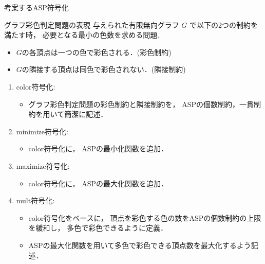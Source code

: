 \documentclass[dvipdfmx,11pt]{beamer}
\begin{document}

\begin{frame}{ 考案するASP符号化}
 \begin{block}{グラフ彩色判定問題の表現}
  与えられた有限無向グラフ $G$ で以下の2つの制約を満たす時，
  必要となる最小の色数を求める問題.
  \begin{itemize}
   \item $G$の各頂点は一つの色で彩色される．(彩色制約)
   \item $G$の隣接する頂点は同色で彩色されない．(隣接制約)
  \end{itemize}
 \end{block}
 \begin{enumerate}
   \item \alert{color符号化}:
         \begin{itemize}
          \item グラフ彩色判定問題の彩色制約と隣接制約を，
                ASPの個数制約，一貫制約を用いて簡潔に記述．
         \end{itemize}
  \item \alert{minimize符号化}:
        \begin{itemize}
         \item color符号化に，%
               ASPの最小化関数を追加．%
        \end{itemize}
  \item \alert{maximize符号化}:
        \begin{itemize}
         \item color符号化に，%
               ASPの最大化関数を追加．
        \end{itemize}
  \item \alert{mult符号化}:
        \begin{itemize}
         \item color符号化をベースに，
               頂点を彩色する色の数をASPの個数制約の上限を緩和し，
               多色で彩色できるように定義．
         \item ASPの最大化関数を用いて多色で彩色できる頂点数を最大化するよう記述．
        \end{itemize}
 \end{enumerate}
\end{frame}
\end{document}
